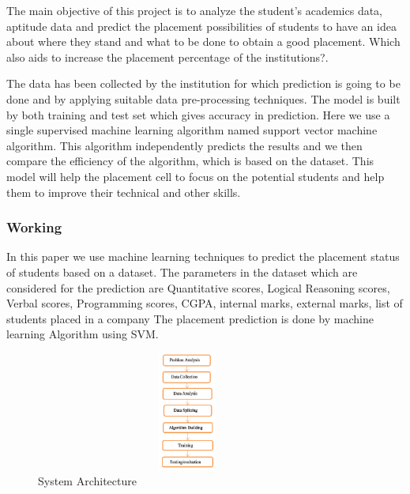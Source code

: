 \documentclass[12pt]{article}
\begin{document}
The main objective of this project is to analyze the student’s academics data, aptitude data and predict the placement possibilities of students to have an idea about where they stand and what to be done to obtain a good placement. Which also aids to increase the placement percentage of the institutions?.

The data has been collected by the institution for which prediction is going to be done and by applying 
suitable data pre-processing techniques. The model is built by both training and test set which gives accuracy in 
prediction. Here we use a single supervised machine learning algorithm named support vector machine algorithm. This 
algorithm independently predicts the results and we then compare the efficiency of the algorithm, which is based on the 
dataset. This model will help the placement cell to focus on the potential students and help them to improve their technical 
and other skills.
\newpage
\subsubsection{Working}
In this paper we use machine learning techniques to predict the placement status of students based on a dataset. The 
parameters in the dataset which are considered for the prediction are Quantitative scores, Logical Reasoning scores, 
Verbal scores, Programming scores, CGPA, internal marks, external marks, list of students placed in a company The 
placement prediction is done by machine learning Algorithm using SVM.

\begin{figure}[H]
\begin{center}
 \includegraphics[width=10cm, height=3.9cm]{L4P1}
\caption{System Architecture}
\end{center}
\end{figure}
\end{document}
